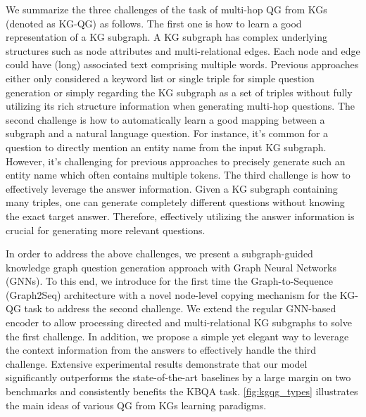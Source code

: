 \documentclass[journal]{IEEEtran}
\begin{document}
We summarize the three challenges of the task of multi-hop QG from KGs (denoted as KG-QG) as follows. The first one is how to learn a good representation of a KG subgraph. A KG subgraph has complex underlying structures such as node attributes and multi-relational edges. Each node and edge could have (long) associated text comprising multiple words. Previous approaches either only considered a keyword list or single triple for simple question generation or simply regarding the KG subgraph as a set of triples without fully utilizing its rich structure information when generating multi-hop questions.
The second challenge is how to automatically learn a good mapping between a subgraph and a natural language question.
For instance, it's common for a question to directly mention an entity name from the input KG subgraph. However, it's challenging for previous approaches to precisely generate such an entity name which often contains multiple tokens.
The third challenge is how to effectively leverage the answer information. Given a KG subgraph containing many triples, one can generate completely different questions without knowing the exact target answer. Therefore, effectively utilizing the answer information is crucial for generating more relevant questions. 



In order to address the above challenges, we present a subgraph-guided knowledge graph question generation approach with Graph Neural Networks (GNNs). To this end, we introduce for the first time the Graph-to-Sequence (Graph2Seq) architecture with a novel node-level copying mechanism for the KG-QG task to address the second challenge. We extend the regular GNN-based encoder to allow processing directed and multi-relational KG subgraphs to solve the first challenge. 
In addition, we propose a simple yet elegant way to leverage the context information from the answers to effectively handle the third challenge. Extensive experimental results demonstrate that our model significantly outperforms the state-of-the-art baselines by a large margin on two benchmarks and consistently benefits the KBQA task. \cref{fig:kgqg_types} illustrates the main ideas of various QG from KGs learning paradigms.
\end{document}
